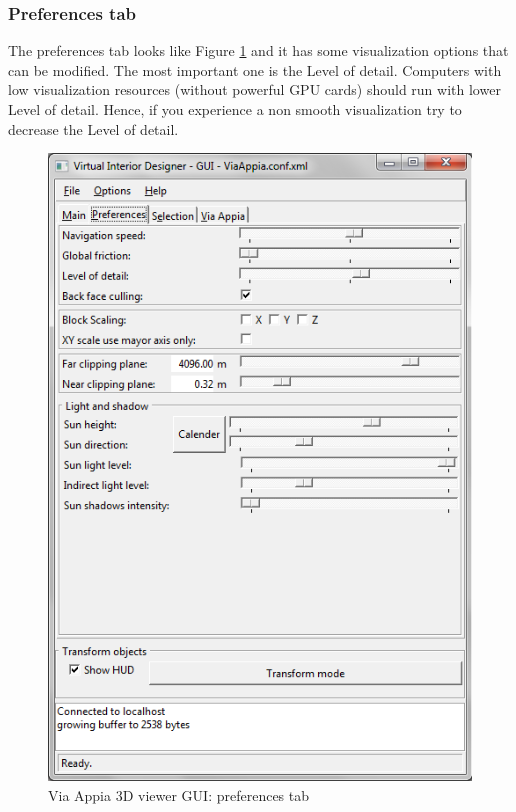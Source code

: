 \documentclass[a4paper,11pt]{article}
\begin{document}
\subsubsection{Preferences tab}

The preferences tab looks like Figure \ref{fig-guipref} and it has some visualization options that can be modified. The most important one is the Level of detail. Computers with low visualization resources (without powerful GPU cards) should run with lower Level of detail. Hence, if you experience a non smooth visualization try to decrease the Level of detail.

\begin{figure}[!ht]
\centering
\includegraphics[scale=0.5]{fig/preferences}
\caption{Via Appia 3D viewer GUI: preferences tab}
\label{fig-guipref}
\end{figure}
\end{document}
